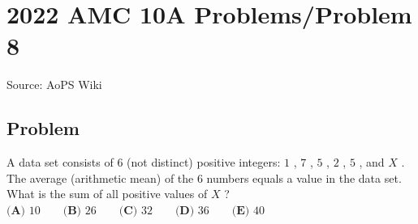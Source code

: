 \documentclass[12pt]{article}
\begin{document}
\section*{{2022 AMC 10A Problems/Problem 8}}
Source: AoPS Wiki

\subsection*{Problem}
A data set consists of $6$ (not distinct) positive integers: $1$ , $7$ , $5$ , $2$ , $5$ , and $X$ . The average (arithmetic mean) of the $6$ numbers equals a value in the data set. What is the sum of all positive values of $X$ ? $\textbf{(A) } 10 \qquad \textbf{(B) } 26 \qquad \textbf{(C) } 32 \qquad \textbf{(D) } 36 \qquad \textbf{(E) } 40$
\end{document}
